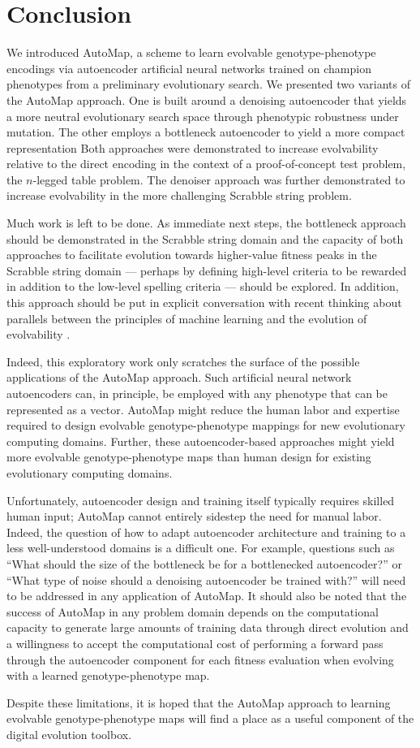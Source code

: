 \section{Conclusion} \label{sec:conclusion}

We introduced AutoMap, a scheme to learn evolvable genotype-phenotype encodings via autoencoder artificial neural networks trained on champion phenotypes from a preliminary evolutionary search.
We presented two variants of the AutoMap approach.
One is built around a denoising autoencoder that yields a more neutral evolutionary search space through phenotypic robustness under mutation.
The other employs a bottleneck autoencoder to yield a more compact representation
Both approaches were demonstrated to increase evolvability relative to the direct encoding in the context of a proof-of-concept test problem, the $n$-legged table problem.
The denoiser approach was further demonstrated to increase evolvability in the more challenging Scrabble string problem.

Much work is left to be done.
As immediate next steps, the bottleneck approach should be demonstrated in the Scrabble string domain and the capacity of both approaches to facilitate evolution towards higher-value fitness peaks in the Scrabble string domain --- perhaps by defining high-level criteria to be rewarded in addition to the low-level spelling criteria --- should be explored.
In addition, this approach should be put in explicit conversation with recent thinking about parallels between the principles of machine learning and the evolution of evolvability \cite{kouvaris2017evolution, watson2016can}.

Indeed, this exploratory work only scratches the surface of the possible applications of the AutoMap approach.
Such artificial neural network autoencoders can, in principle, be employed with any phenotype that can be represented as a vector.
AutoMap might reduce the human labor and expertise required to design evolvable genotype-phenotype mappings for new evolutionary computing domains.
Further, these autoencoder-based approaches might yield more evolvable genotype-phenotype maps than human design for existing evolutionary computing domains.

Unfortunately, autoencoder design and training itself typically requires skilled human input; AutoMap cannot entirely sidestep the need for manual labor.
Indeed, the question of how to adapt autoencoder architecture and training to a less well-understood domains is a difficult one.
For example, questions such as ``What should the size of the bottleneck be for a bottlenecked autoencoder?'' or ``What type of noise should a denoising autoencoder be trained with?'' will need to be addressed in any application of AutoMap.
It should also be noted that the success of AutoMap in any problem domain depends on the computational capacity to generate large amounts of training data through direct evolution and a willingness to accept the computational cost of performing a forward pass through the autoencoder component for each fitness evaluation when evolving with a learned genotype-phenotype map.

Despite these limitations, it is hoped that the AutoMap approach to learning evolvable genotype-phenotype maps will find a place as a useful component of the digital evolution toolbox.
